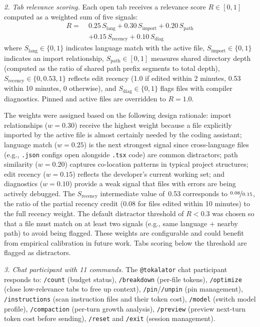 \documentclass[a4paper,fleqn]{cas-dc}
\begin{document}
\textit{2. Tab relevance scoring.}
Each open tab receives a relevance score $R \in [0, 1]$ computed as a weighted sum of five signals:
\begin{equation}
\begin{aligned}
R =\;& 0.25\,S_{\text{lang}} + 0.30\,S_{\text{import}} + 0.20\,S_{\text{path}} \\
     &+ 0.15\,S_{\text{recency}} + 0.10\,S_{\text{diag}}
\end{aligned}
\end{equation} 
where $S_{\text{lang}} \in \{0, 1\}$ indicates language match with the active file, $S_{\text{import}} \in \{0, 1\}$ indicates an import relationship, $S_{\text{path}} \in [0, 1]$ measures shared directory depth (computed as the ratio of shared path prefix segments to total depth), $S_{\text{recency}} \in \{0, 0.53, 1\}$ reflects edit recency (1.0 if edited within 2 minutes, 0.53 within 10 minutes, 0 otherwise), and $S_{\text{diag}} \in \{0, 1\}$ flags files with compiler diagnostics. Pinned and active files are overridden to $R = 1.0$.

The weights were assigned based on the following design rationale: import relationships ($w=0.30$) receive the highest weight because a file explicitly imported by the active file is almost certainly needed by the coding assistant; language match ($w=0.25$) is the next strongest signal since cross-language files (e.g., \texttt{.json} configs open alongside \texttt{.tsx} code) are common distractors; path similarity ($w=0.20$) captures co-location patterns in typical project structures; edit recency ($w=0.15$) reflects the developer's current working set; and diagnostics ($w=0.10$) provide a weak signal that files with errors are being actively debugged.
The $S_{\text{recency}}$ intermediate value of~0.53 corresponds to $\nicefrac{0.08}{0.15}$, the ratio of the partial recency credit (0.08 for files edited within 10 minutes) to the full recency weight.
The default distractor threshold of $R < 0.3$ was chosen so that a file must match on at least two signals (e.g., same language + nearby path) to avoid being flagged.
These weights are configurable and could benefit from empirical calibration in future work.
Tabs scoring below the threshold are flagged as distractors.

\textit{3. Chat participant with 11 commands.}
The \texttt{@tokalator} chat participant responds to: \texttt{/count} (budget status), \texttt{/breakdown} (per-file tokens), \texttt{/optimize} (close low-relevance tabs to free up context), \texttt{/pin}/\texttt{/unpin} (pin management), \texttt{/instructions} (scan instruction files and their token cost), \texttt{/model} (switch model profile), \texttt{/compaction} (per-turn growth analysis), \texttt{/preview} (preview next-turn token cost before sending), \texttt{/reset} and \texttt{/exit} (session management).
\end{document}
